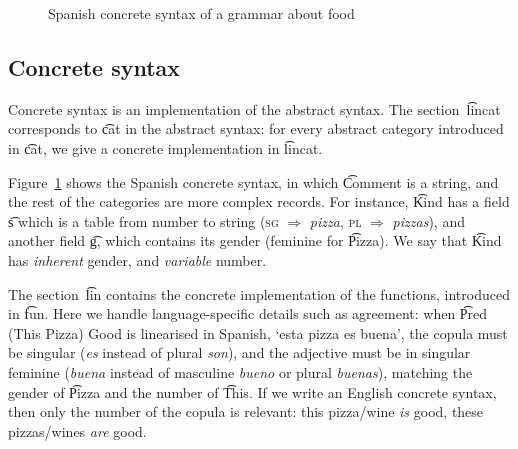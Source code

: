 \begin{figure}[h]
\begin{Shaded}
\begin{Highlighting}[]
  \FunctionTok{=}
      \FunctionTok{=}   \NormalTok{\{ } \OtherTok{=>}  \OtherTok{=>} 
       \FunctionTok{=} \FunctionTok{++} \FunctionTok{!}  \NormalTok{;} \FunctionTok{=}  \FunctionTok{=} 
    \FunctionTok{=}  \OtherTok{=>}  \NormalTok{; } \OtherTok{=>}  \NormalTok{\} ;}
    \FunctionTok{=}   \NormalTok{\{ } \OtherTok{=>} \FunctionTok{++}  \OtherTok{=>} \FunctionTok{++} 
\end{Highlighting}
\end{Shaded}
  \caption{Spanish concrete syntax of a \gf{} grammar about food}
\label{fig:spanish}
\end{figure}

\subsection{Concrete syntax}
\label{concrete_spanish_foods}
Concrete syntax is an implementation of the abstract syntax.
The section~\t{lincat} corresponds to \t{cat} in the abstract syntax:
for every abstract category introduced in \t{cat}, we give a concrete
implementation in \t{lincat}.


Figure~\ref{fig:spanish} shows the Spanish concrete
syntax, in which \t{Comment} is a string, and the rest of the
categories are more complex records. For instance, \t{Kind} has a
field \t{s} which is a table from number to string (\textsc{sg} $\Rightarrow$
\emph{pizza}, \textsc{pl} $\Rightarrow$ \emph{pizzas}), and another
field \t{g}, which contains its gender (feminine for \t{Pizza}). We
say that \t{Kind} has \emph{inherent} gender, and \emph{variable} number. 

The section~\t{lin} contains the concrete implementation of the
functions, introduced in \t{fun}. Here we handle
language-specific details such as agreement: when \t{Pred (This Pizza)
  Good} is linearised in Spanish, `esta pizza es buena', the copula must be singular
(\emph{es} instead of plural \emph{son}), and the adjective must be in singular
feminine (\emph{buena} instead of masculine \emph{bueno} or plural
\emph{buenas}), matching the gender of \t{Pizza} and the number of \t{This}. 
If we write an English concrete syntax, then only the number of the copula is
relevant: this pizza/wine \emph{is} good, these pizzas/wines \emph{are} good.


